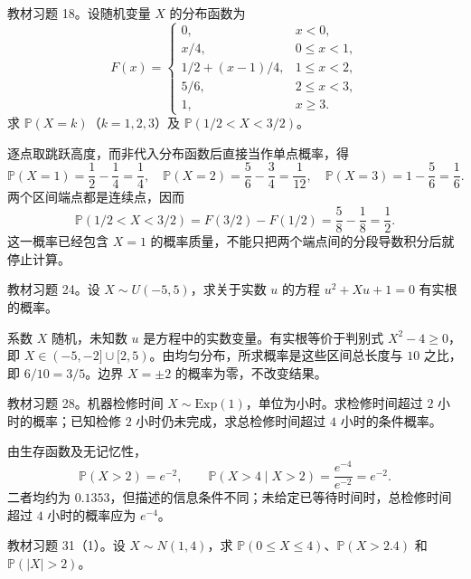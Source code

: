\begin{example}
\label{ex:study-ch2-exercise-18}
教材习题 18。设随机变量 $X$ 的分布函数为
\[
  F(x)=\begin{cases}
    0,&x<0,\\
    x/4,&0\le x<1,\\
    1/2+(x-1)/4,&1\le x<2,\\
    5/6,&2\le x<3,\\
    1,&x\ge3.
  \end{cases}
\]
求 $\mathbb P(X=k)$（$k=1,2,3$）及 $\mathbb P(1/2<X<3/2)$。
\end{example}

\begin{solve}
逐点取跳跃高度，而非代入分布函数后直接当作单点概率，得
\[
  \mathbb P(X=1)=\frac12-\frac14=\frac14,\quad
  \mathbb P(X=2)=\frac56-\frac34=\frac1{12},\quad
  \mathbb P(X=3)=1-\frac56=\frac16.
\]
两个区间端点都是连续点，因而
\[
  \mathbb P(1/2<X<3/2)=F(3/2)-F(1/2)=\frac58-\frac18=\frac12.
\]
这一概率已经包含 $X=1$ 的概率质量，不能只把两个端点间的分段导数积分后就停止计算。
\end{solve}

\begin{example}
\label{ex:study-ch2-exercise-24}
教材习题 24。设 $X\sim U(-5,5)$，求关于实数 $u$ 的方程 $u^2+Xu+1=0$ 有实根的概率。
\end{example}

\begin{solve}
系数 $X$ 随机，未知数 $u$ 是方程中的实数变量。有实根等价于判别式 $X^2-4\ge0$，即 $X\in(-5,-2]\cup[2,5)$。由均匀分布，所求概率是这些区间总长度与 $10$ 之比，即 $6/10=3/5$。边界 $X=\pm2$ 的概率为零，不改变结果。
\end{solve}

\begin{example}
\label{ex:study-ch2-exercise-28}
教材习题 28。机器检修时间 $X\sim\mathrm{Exp}(1)$，单位为小时。求检修时间超过 $2$ 小时的概率；已知检修 $2$ 小时仍未完成，求总检修时间超过 $4$ 小时的条件概率。
\end{example}

\begin{solve}
由生存函数及无记忆性，
\[
  \mathbb P(X>2)=e^{-2},\qquad
  \mathbb P(X>4\mid X>2)=\frac{e^{-4}}{e^{-2}}=e^{-2}.
\]
二者均约为 $0.1353$，但描述的信息条件不同；未给定已等待时间时，总检修时间超过 $4$ 小时的概率应为 $e^{-4}$。
\end{solve}

\begin{example}
\label{ex:study-ch2-exercise-31}
教材习题 31（1）。设 $X\sim N(1,4)$，求 $\mathbb P(0\le X\le4)$、$\mathbb P(X>2.4)$ 和 $\mathbb P(|X|>2)$。
\end{example}


